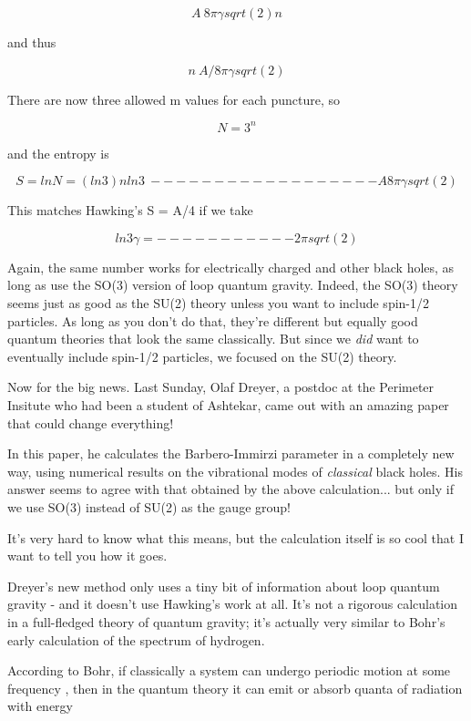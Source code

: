 $$
A ~ 8 \pi  \gamma  sqrt(2) n 
$$
    
and thus

$$
n ~ A / 8 \pi  \gamma  sqrt(2)
$$
    
There are now three allowed m values for each puncture, so

$$
N = 3^{n}
$$
    
and the entropy is

$$
S = ln N

  = (ln 3) n


           ln 3
  ~ ------------------ A
    8 \pi  \gamma  sqrt(2)      
$$
    
This matches Hawking's S = A/4 if we take

$$
            ln 3
\gamma  = -----------
        2 \pi  sqrt(2)
$$
    
Again, the same number works for electrically charged and other black
holes, as long as use the SO(3) version of loop quantum gravity.
Indeed, the SO(3) theory seems just as good as the SU(2) theory unless
you want to include spin-1/2 particles.  As long as you don't do that,
they're different but equally good quantum theories that look the same
classically.  But since we \emph{did} want to eventually include spin-1/2
particles, we focused on the SU(2) theory.

Now for the big news.  Last Sunday, Olaf Dreyer, a postdoc at the
Perimeter Insitute who had been a student of Ashtekar, came out with an
amazing paper that could change everything!

In this paper, he calculates the Barbero-Immirzi parameter in a
completely new way, using numerical results on the vibrational modes of
\emph{classical} black holes.  His answer seems to agree with that obtained
by the above calculation...  but only if we use SO(3) instead of SU(2)
as the gauge group!

It's very hard to know what this means, but the calculation itself is so
cool that I want to tell you how it goes.

Dreyer's new method only uses a tiny bit of information about loop
quantum gravity - and it doesn't use Hawking's work at all.  It's not a
rigorous calculation in a full-fledged theory of quantum gravity; it's
actually very similar to Bohr's early calculation of the spectrum of
hydrogen.

According to Bohr, if classically a system can undergo periodic motion
at some frequency \omega , then in the quantum theory it can emit or
absorb quanta of radiation with energy 

